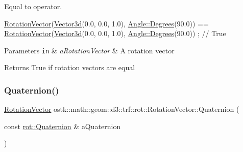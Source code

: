 Equal to operator. 


\begin{DoxyCode}
\hyperlink{classostk_1_1math_1_1geom_1_1d3_1_1trf_1_1rot_1_1_rotation_vector_ad05e6af649dbdd145793773e2ab1cdce}{RotationVector}(\hyperlink{namespaceostk_1_1math_1_1obj_a18744cbf433bce59f6758d9fe3b1dff1}{Vector3d}(0.0, 0.0, 1.0), \hyperlink{classostk_1_1math_1_1geom_1_1_angle_a2cefda601167af07f61f0477776203ca}{Angle::Degrees}(90.0)) == 
      \hyperlink{classostk_1_1math_1_1geom_1_1d3_1_1trf_1_1rot_1_1_rotation_vector_ad05e6af649dbdd145793773e2ab1cdce}{RotationVector}(\hyperlink{namespaceostk_1_1math_1_1obj_a18744cbf433bce59f6758d9fe3b1dff1}{Vector3d}(0.0, 0.0, 1.0), \hyperlink{classostk_1_1math_1_1geom_1_1_angle_a2cefda601167af07f61f0477776203ca}{Angle::Degrees}(90.0)) ; \textcolor{comment}{// True}
\end{DoxyCode}



\begin{DoxyParams}[1]{Parameters}
\mbox{\tt in}  & {\em a\+Rotation\+Vector} & A rotation vector \\
\hline
\end{DoxyParams}
\begin{DoxyReturn}{Returns}
True if rotation vectors are equal 
\end{DoxyReturn}
\mbox{\label{classostk_1_1math_1_1geom_1_1d3_1_1trf_1_1rot_1_1_rotation_vector_a48571eb0d572f0a97caa5aa95a0f1b68}} 
\subsubsection{\texorpdfstring{Quaternion()}{Quaternion()}}
{\footnotesize\ttfamily \hyperlink{classostk_1_1math_1_1geom_1_1d3_1_1trf_1_1rot_1_1_rotation_vector}{Rotation\+Vector} ostk\+::math\+::geom\+::d3\+::trf\+::rot\+::\+Rotation\+Vector\+::\+Quaternion (\begin{DoxyParamCaption}\item[{const \hyperlink{classostk_1_1math_1_1geom_1_1d3_1_1trf_1_1rot_1_1_quaternion}{rot\+::\+Quaternion} \&}]{a\+Quaternion }\end{DoxyParamCaption})\hspace{0.3cm}{\ttfamily [static]}}



